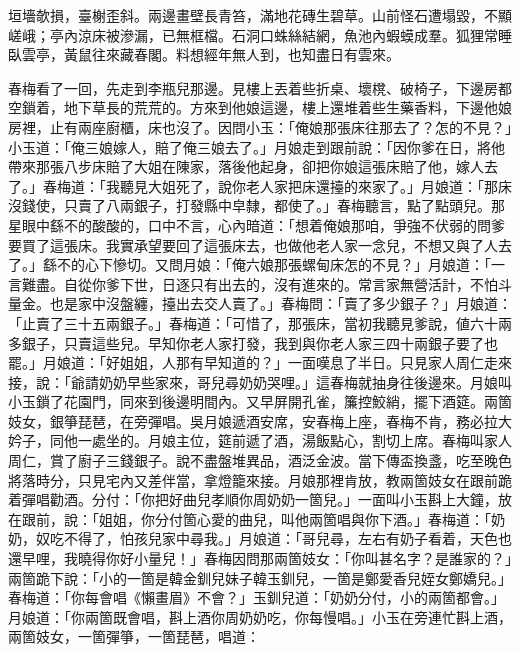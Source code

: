 \begin{myquote}
垣墻欹損，臺榭歪斜。兩邊畫壁長青笞，滿地花磚生碧草。山前怪石遭塌毀，不顯嵯峨；亭內涼床被滲漏，已無框檔。石洞口蛛絲結網，魚池內蝦蟆成羣。狐狸常睡臥雲亭，黃鼠往來藏春閣。料想經年無人到，也知盡日有雲來。
\end{myquote}

春梅看了一回，先走到李瓶兒那邊。見樓上丟着些折桌、壞櫈、破椅子，下邊房都空鎖着，地下草長的荒荒的。{}方來到他娘這邊，樓上還堆着些生藥香料，下邊他娘房裡，止有兩座廚櫃，床也沒了。因問小玉：「俺娘那張床往那去了？怎的不見？」小玉道：「俺三娘嫁人，賠了俺三娘去了。」月娘走到跟前說：「因你爹在日，將他帶來那張八步床賠了大姐在陳家，落後他起身，卻把你娘這張床賠了他，嫁人去了。」春梅道：「我聽見大姐死了，說你老人家把床還擡的來家了。」月娘道：「那床沒錢使，只賣了八兩銀子，打發縣中皁隸，都使了。」春梅聽言，點了點頭兒。那星眼中繇不的酸酸的，口中不言，心內暗道：「想着俺娘那咱，爭強不伏弱的問爹要買了這張床。我實承望要回了這張床去，也做他老人家一念兒，不想又與了人去了。」繇不的心下慘切。{}又問月娘：「俺六娘那張螺甸床怎的不見？」月娘道：「一言難盡。自從你爹下世，日逐只有出去的，沒有進來的。常言家無營活計，不怕斗量金。也是家中沒盤纏，擡出去交人賣了。」春梅問：「賣了多少銀子？」月娘道：「止賣了三十五兩銀子。」春梅道：「可惜了，那張床，當初我聽見爹說，値六十兩多銀子，只賣這些兒。早知你老人家打發，我到與你老人家三四十兩銀子要了也罷。」月娘道：「好姐姐，人那有早知道的？」一面嘆息了半日。只見家人周仁走來接，說：「爺請奶奶早些家來，哥兒尋奶奶哭哩。」這春梅就抽身往後邊來。月娘叫小玉鎖了花園門，同來到後邊明間內。又早屏開孔雀，簾控鮫綃，擺下酒筵。兩箇妓女，銀箏琵琶，在旁彈唱。吳月娘遞酒安席，安春梅上座，{}春梅不肯，務必拉大妗子，同他一處坐的。月娘主位，筵前遞了酒，湯飯點心，割切上席。春梅叫家人周仁，賞了廚子三錢銀子。說不盡盤堆異品，酒泛金波。當下傳盃換盞，吃至晚色將落時分，只見宅內又差伴當，拿燈籠來接。月娘那裡肯放，教兩箇妓女在跟前跪着彈唱勸酒。分付：「你把好曲兒孝順你周奶奶一箇兒。」一面叫小玉斟上大鐘，放在跟前，說：「姐姐，你分付箇心愛的曲兒，叫他兩箇唱與你下酒。」春梅道：「奶奶，奴吃不得了，怕孩兒家中尋我。」月娘道：「哥兒尋，左右有奶子看着，天色也還早哩，我曉得你好小量兒！」春梅因問那兩箇妓女：「你叫甚名字？是誰家的？」兩箇跪下說：「小的一箇是韓金釧兒妹子韓玉釧兒，一箇是鄭愛香兒姪女鄭嬌兒。」春梅道：「你每會唱《懶畫眉》不會？」玉釧兒道：「奶奶分付，小的兩箇都會。」月娘道：「你兩箇既會唱，斟上酒你周奶奶吃，你每慢唱。」小玉在旁連忙斟上酒，兩箇妓女，一箇彈箏，一箇琵琶，唱道：

